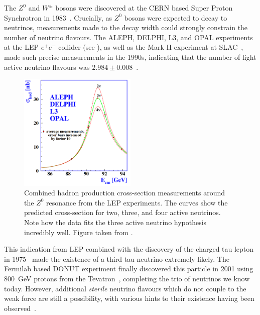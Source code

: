 The $Z^{0}$ and $W^{\pm}$ bosons were discovered at the CERN based Super Proton Synchrotron in
1983~\cite{arnison1983_z, arnison1983_w}. Crucially, as $Z^{0}$ bosons were expected to decay to
neutrinos, measurements made to the decay width could strongly constrain the number of neutrino
flavours. The ALEPH, DELPHI, L3, and OPAL experiments at the LEP $e^{+}e^{-}$ collider (see
), as well as the Mark II experiment at SLAC~\cite{abrams1989}, made
such precise measurements in the 1990s, indicating that the number of light active neutrino
flavours was $2.984\pm0.008$~\cite{electroweak2006}.

\begin{figure} %
    \includegraphics[origin=c,width=0.5\textwidth]{diagrams/3-theory/z_resonance.pdf}
    \caption[Hadron production cross-section measurements from LEP]
    {Combined hadron production cross-section measurements around the $Z^{0}$ resonance from the
        LEP experiments. The curves show the predicted cross-section for two, three, and four
        active neutrinos. Note how the data fits the three active neutrino hypothesis incredibly
        well. Figure taken from .}
    \label{fig:z_resonance}
\end{figure}

This indication from LEP combined with the discovery of the charged tau lepton in
1975~\cite{perl1975} made the existence of a third tau neutrino extremely likely. The Fermilab
based DONUT experiment finally discovered this particle in 2001 using \SI{800}{\GeV} protons from
the Tevatron~\cite{Kodama2001}, completing the trio of neutrinos we know today. However,
additional \emph{sterile} neutrino flavours which do not couple to the weak force are still a
possibility, with various hints to their existence having been observed~\cite{particle2020}.

